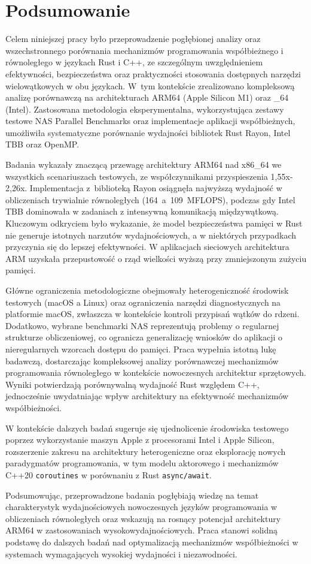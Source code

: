 \chapter{Podsumowanie}
Celem niniejszej pracy było przeprowadzenie pogłębionej analizy oraz wszechstronnego porównania mechanizmów programowania współbieżnego i równoległego w językach Rust i C++, ze szczególnym uwzględnieniem efektywności, bezpieczeństwa oraz praktyczności stosowania dostępnych narzędzi wielowątkowych w obu językach. W~tym kontekście zrealizowano kompleksową analizę porównawczą na architekturach ARM64 (Apple Silicon M1) oraz \_64 (Intel). Zastosowana metodologia eksperymentalna, wykorzystująca zestawy testowe NAS Parallel Benchmarks oraz implementacje aplikacji współbieżnych, umożliwiła systematyczne porównanie wydajności bibliotek Rust Rayon, Intel TBB oraz OpenMP.

Badania wykazały znaczącą przewagę architektury ARM64 nad x86\_64 we wszystkich scenariuszach testowych, ze współczynnikami przyspieszenia 1,55x-2,26x. Implementacja z~biblioteką Rayon osiągnęła najwyższą wydajność w obliczeniach trywialnie równoległych \mbox{(164 a 109 MFLOPS)}, podczas gdy Intel TBB dominowała w zadaniach z intensywną komunikacją międzywątkową. Kluczowym odkryciem było wykazanie, że model bezpieczeństwa pamięci w Rust nie generuje istotnych narzutów wydajnościowych, a w niektórych przypadkach przyczynia się do lepszej efektywności. W aplikacjach sieciowych architektura ARM uzyskała przepustowość o rząd wielkości wyższą przy zmniejszonym zużyciu pamięci.

Główne ograniczenia metodologiczne obejmowały heterogeniczność środowisk testowych (macOS a Linux) oraz ograniczenia narzędzi diagnostycznych na platformie macOS, zwłaszcza w kontekście kontroli przypisań wątków do rdzeni. Dodatkowo, wybrane benchmarki NAS reprezentują problemy o regularnej strukturze obliczeniowej, co ogranicza generalizację wniosków do aplikacji o nieregularnych wzorcach dostępu do pamięci.
Praca wypełnia istotną lukę badawczą, dostarczając kompleksowej analizy porównawczej mechanizmów programowania równoległego w kontekście nowoczesnych architektur sprzętowych. Wyniki potwierdzają porównywalną wydajność Rust względem C++, jednocześnie uwydatniając wpływ architektury na efektywność mechanizmów współbieżności.

W kontekście dalszych badań sugeruje się ujednolicenie środowiska testowego poprzez wykorzystanie maszyn Apple z procesorami Intel i Apple Silicon, rozszerzenie zakresu na architektury heterogeniczne oraz eksplorację nowych paradygmatów programowania, w tym modelu aktorowego i mechanizmów C++20 \texttt{coroutines} w porównaniu z Rust \texttt{async/await}.

Podsumowując, przeprowadzone badania pogłębiają wiedzę na temat charakterystyk wydajnościowych nowoczesnych języków programowania w obliczeniach równoległych oraz wskazują na rosnący potencjał architektury ARM64 w zastosowaniach wysokowydajnościowych. Praca stanowi solidną podstawę do dalszych badań nad optymalizacją mechanizmów współbieżności w systemach wymagających wysokiej wydajności i niezawodności.